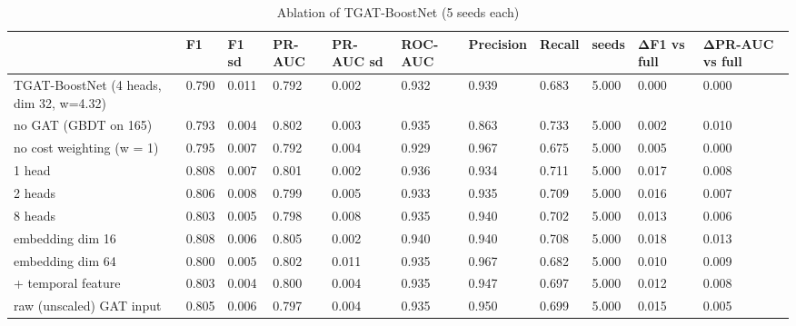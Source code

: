 \begin{table}
\caption{Ablation of TGAT-BoostNet (5 seeds each)}
\label{tab:03_ablation}
\begin{tabular}{lllllllllll}
\toprule
 & F1 & F1 sd & PR-AUC & PR-AUC sd & ROC-AUC & Precision & Recall & seeds & ΔF1 vs full & ΔPR-AUC vs full \\
\midrule
TGAT-BoostNet (4 heads, dim 32, w=4.32) & 0.790 & 0.011 & 0.792 & 0.002 & 0.932 & 0.939 & 0.683 & 5.000 & 0.000 & 0.000 \\
no GAT (GBDT on 165) & 0.793 & 0.004 & 0.802 & 0.003 & 0.935 & 0.863 & 0.733 & 5.000 & 0.002 & 0.010 \\
no cost weighting (w = 1) & 0.795 & 0.007 & 0.792 & 0.004 & 0.929 & 0.967 & 0.675 & 5.000 & 0.005 & 0.000 \\
1 head & 0.808 & 0.007 & 0.801 & 0.002 & 0.936 & 0.934 & 0.711 & 5.000 & 0.017 & 0.008 \\
2 heads & 0.806 & 0.008 & 0.799 & 0.005 & 0.933 & 0.935 & 0.709 & 5.000 & 0.016 & 0.007 \\
8 heads & 0.803 & 0.005 & 0.798 & 0.008 & 0.935 & 0.940 & 0.702 & 5.000 & 0.013 & 0.006 \\
embedding dim 16 & 0.808 & 0.006 & 0.805 & 0.002 & 0.940 & 0.940 & 0.708 & 5.000 & 0.018 & 0.013 \\
embedding dim 64 & 0.800 & 0.005 & 0.802 & 0.011 & 0.935 & 0.967 & 0.682 & 5.000 & 0.010 & 0.009 \\
+ temporal feature & 0.803 & 0.004 & 0.800 & 0.004 & 0.935 & 0.947 & 0.697 & 5.000 & 0.012 & 0.008 \\
raw (unscaled) GAT input & 0.805 & 0.006 & 0.797 & 0.004 & 0.935 & 0.950 & 0.699 & 5.000 & 0.015 & 0.005 \\
\bottomrule
\end{tabular}
\end{table}
